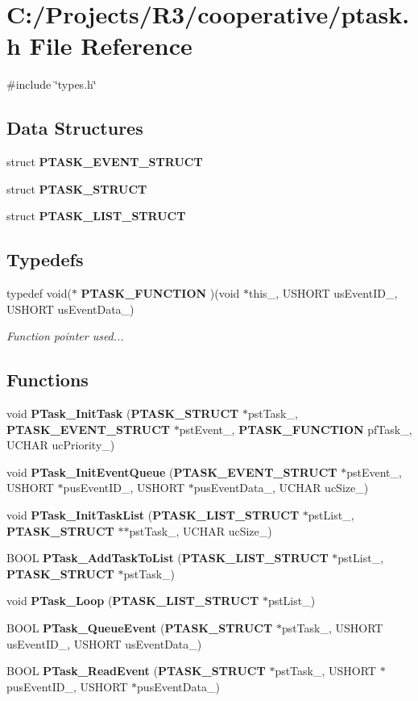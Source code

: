 \section{C:/Projects/R3/cooperative/ptask.h File Reference}
\label{ptask_8h}
{\ttfamily \#include \char`\"{}types.h\char`\"{}}\par
\subsection*{Data Structures}
\begin{DoxyCompactItemize}
\item 
struct {\bf PTASK\_\-EVENT\_\-STRUCT}
\item 
struct {\bf PTASK\_\-STRUCT}
\item 
struct {\bf PTASK\_\-LIST\_\-STRUCT}
\end{DoxyCompactItemize}
\subsection*{Typedefs}
\begin{DoxyCompactItemize}
\item 
typedef void($\ast$ {\bf PTASK\_\-FUNCTION} )(void $\ast$this\_\-, USHORT usEventID\_\-, USHORT usEventData\_\-)
\begin{DoxyCompactList}\small\item\em Function pointer used... \item\end{DoxyCompactList}\end{DoxyCompactItemize}
\subsection*{Functions}
\begin{DoxyCompactItemize}
\item 
void {\bf PTask\_\-InitTask} ({\bf PTASK\_\-STRUCT} $\ast$pstTask\_\-, {\bf PTASK\_\-EVENT\_\-STRUCT} $\ast$pstEvent\_\-, {\bf PTASK\_\-FUNCTION} pfTask\_\-, UCHAR ucPriority\_\-)
\item 
void {\bf PTask\_\-InitEventQueue} ({\bf PTASK\_\-EVENT\_\-STRUCT} $\ast$pstEvent\_\-, USHORT $\ast$pusEventID\_\-, USHORT $\ast$pusEventData\_\-, UCHAR ucSize\_\-)
\item 
void {\bf PTask\_\-InitTaskList} ({\bf PTASK\_\-LIST\_\-STRUCT} $\ast$pstList\_\-, {\bf PTASK\_\-STRUCT} $\ast$$\ast$pstTask\_\-, UCHAR ucSize\_\-)
\item 
BOOL {\bf PTask\_\-AddTaskToList} ({\bf PTASK\_\-LIST\_\-STRUCT} $\ast$pstList\_\-, {\bf PTASK\_\-STRUCT} $\ast$pstTask\_\-)
\item 
void {\bf PTask\_\-Loop} ({\bf PTASK\_\-LIST\_\-STRUCT} $\ast$pstList\_\-)
\item 
BOOL {\bf PTask\_\-QueueEvent} ({\bf PTASK\_\-STRUCT} $\ast$pstTask\_\-, USHORT usEventID\_\-, USHORT usEventData\_\-)
\item 
BOOL {\bf PTask\_\-ReadEvent} ({\bf PTASK\_\-STRUCT} $\ast$pstTask\_\-, USHORT $\ast$pusEventID\_\-, USHORT $\ast$pusEventData\_\-)
\end{DoxyCompactItemize}


